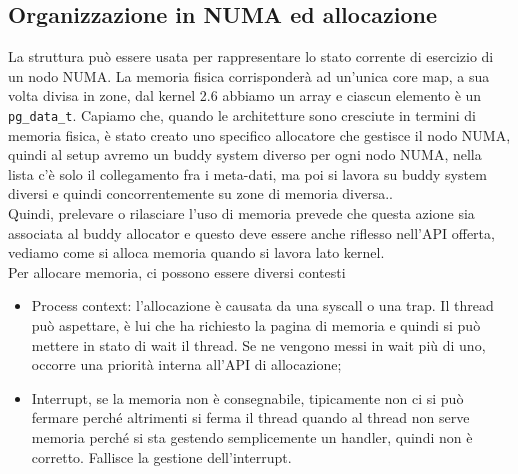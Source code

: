 \documentclass[12pt, oneside]{extbook}
\begin{document}
\subsection{Organizzazione in NUMA ed allocazione}
La struttura può essere usata per rappresentare lo stato corrente di esercizio di un nodo NUMA. La memoria fisica corrisponderà ad un'unica core map, a sua volta divisa in zone, dal kernel 2.6 abbiamo un array e ciascun elemento è un \texttt{pg\_data\_t}. Capiamo che, quando le architetture sono cresciute in termini di memoria fisica, è stato creato uno specifico allocatore che gestisce il nodo NUMA, quindi al setup avremo un buddy system diverso per ogni nodo NUMA, nella lista c'è solo il collegamento fra i meta-dati, ma poi si lavora su buddy system diversi e quindi concorrentemente su zone di memoria diversa..\\ Quindi, prelevare o rilasciare l'uso di memoria prevede che questa azione sia associata al buddy allocator e questo deve essere anche riflesso nell'API offerta, vediamo come si alloca memoria quando si lavora lato kernel.\\ Per allocare memoria, ci possono essere diversi contesti
\begin{itemize}
\item Process context: l'allocazione è causata da una syscall o una trap. Il thread può aspettare, è lui che ha richiesto la pagina di memoria e quindi si può mettere in stato di wait il thread. Se ne vengono messi in wait più di uno, occorre una priorità interna all'API di allocazione;
\item Interrupt, se la memoria non è consegnabile, tipicamente non ci si può fermare perché altrimenti si ferma il thread quando al thread non serve memoria perché si sta gestendo semplicemente un handler, quindi non è corretto. Fallisce la gestione dell'interrupt. 
\end{itemize} 
\end{document}
